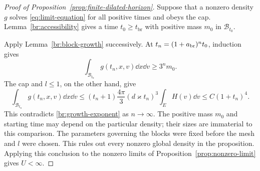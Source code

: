 \begin{proof}[Proof of Proposition~\ref{prop:finite-dilated-horizon}]
Suppose that a nonzero density \(g\) solves
\eqref{eq:limit-equation} for all positive times and obeys the cap.
Lemma~\ref{br:accessibility} gives a time \(t_0\ge t_{\mathrm{br}}\)
with positive mass \(m_0\) in \(\mathcal B_{t_0}\).

Apply Lemma~\ref{br:block-growth} successively.
At \(t_n=(1+a_{\rm br})^nt_0\), induction gives
\[
\int_{\mathcal B_{t_n}}g(t_n,x,v)\dd x\dd v\ge3^n m_0.
\]
The cap and \(l\le1\), on the other hand, give
\[
\int_{\mathcal B_{t_n}}g(t_n,x,v)\dd x\dd v
\le (t_n+1)\frac{4\pi}{3}(d\varkappa t_n)^3\int_E H(v)\dd v
\le C(1+t_n)^4.
\]
This contradicts \eqref{br:growth-exponent} as \(n\to\infty\).
The positive mass \(m_0\) and starting time may depend on the particular
density; their sizes are immaterial to this comparison. The parameters
governing the blocks were fixed before the mesh and \(l\) were chosen.
This rules out every nonzero global density in the proposition.
Applying this conclusion to the nonzero limits of
Proposition~\ref{prop:nonzero-limit} gives \(U<\infty\).
\end{proof}
